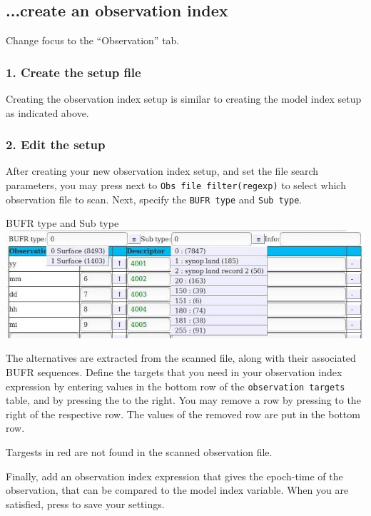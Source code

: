 \documentclass[letterpaper,10pt,twoside,twocolumn,openany]{book}
\begin{document}
{\subsection{...create an observation index}
Change focus to the ``Observation'' tab. 

\subsubsection{1. Create the setup file}
Creating the observation index setup is similar to creating the model index setup as indicated above.

\subsubsection{2. Edit the setup}
After creating your new observation index setup, and set the file search parameters,
you may press  next to
\lstinline!Obs file filter(regexp)! to select which observation file to scan.
Next, specify the \lstinline!BUFR type! and \lstinline!Sub type!.
\begin{paperbox}{BUFR type and Sub type}
  \includegraphics[width=\columnwidth]{how_obs.jpg}
\end{paperbox}
The alternatives are extracted from the scanned file, along with their associated BUFR sequences.
Define the targets that you need in your observation index expression by entering values
in the bottom row of the \lstinline!observation targets! table, and by pressing the  to the right.
You may remove a row by pressing   to the right of the respective row.
The values of the removed row are put in the bottom row.
\begin{quotebox}
  Targests in red are not found in the scanned observation file.
\end{quotebox}
Finally, add an observation index expression that gives the epoch-time 
of the observation, that can be compared to the model index variable.
When you are satisfied, press  to save your settings.

}
\end{document}
